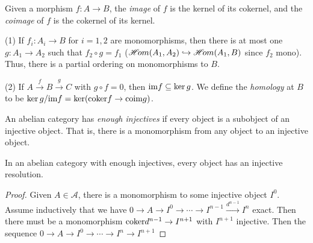  \setcounter{lecture}{2}

\def\A{\mathcal{A}}

\begin{definition}
 Given a morphism $f:A\to B$, the \emph{image} of $f$ is the
kernel of its cokernel, and the \emph{coimage} of $f$ is the
cokernel of its kernel.
\end{definition}

\begin{remark}\begin{list}{}{}
\item[(1)] If $f_i:A_i\to B$ for $i=1,2$ are monomorphisms, then
there is at most one $g:A_1\to A_2$ such that $f_2\circ g=f_1$
($\mathscr{H}\!om(A_1,A_2)\hookrightarrow \mathscr{H}\!om(A_1,B)$ since $f_2$ mono).
Thus, there is a partial ordering on monomorphisms to $B$.
 \item[(2)] If $A\xrightarrow{f}B\xrightarrow{g}C$ with $g\circ
 f=0$, then $\text{im} f \subseteq \ker g$.  We define the
 \emph{homology} at $B$ to be $\ker g/\text{im} f = \ker (\text{\rm coker} f \to \text{\rm coim} g)$.
\end{list}\end{remark}

\begin{definition}
An abelian category has \emph{enough injectives} if every object
is a subobject of an injective object.  That is, there is a
monomorphism from any object to an injective object.
\end{definition}

\begin{lemma}
 In an abelian category with enough injectives, every object has
 an injective resolution.
\end{lemma}
\begin{proof}
Given $A\in \A$, there is a monomorphism to some injective object
$I^0$.  Assume inductively that we have $0\to A \to I^0\to \cdots
\to I^{n-1}\xrightarrow{d^{n-1}} I^n$ exact.  Then there must be a
monomorphism $\text{\rm coker} d^{n-1}\to I^{n+1}$ with $I^{n+1}$ injective.
Then the sequence $0\to A \to I^0\to \cdots \to I^n\to I^{n+1}$
\end{proof}

